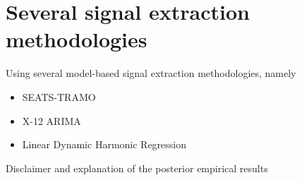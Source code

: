 \begin{slide}
  \begin{center}
  \end{center}
\end{slide}


\section[Methodologies]{Several signal extraction methodologies}

\begin{slide}
  Using several model-based signal extraction methodologies, namely

  \begin{itemize}
  \item SEATS-TRAMO
  \item X-12 ARIMA
  \item Linear Dynamic Harmonic Regression \citep{Bujosa:CSDA-52-999}
  \end{itemize}

  Disclaimer and explanation of the posterior empirical results
\end{slide}

